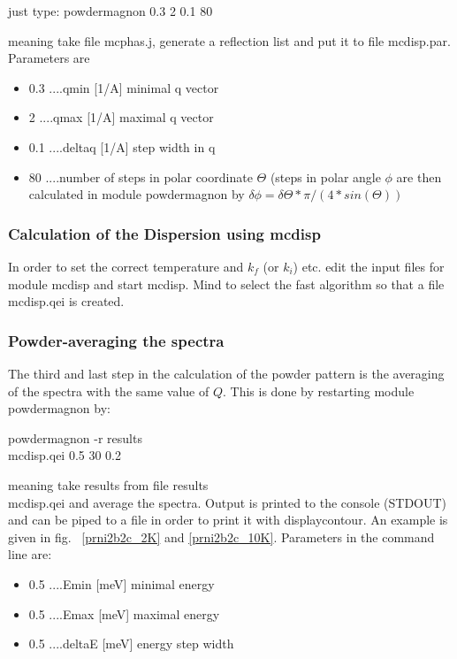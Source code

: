 just type: powdermagnon 0.3 2 0.1 80

meaning take file {\prg mcphas.j}, generate a reflection list and put it to 
file {\prg mcdisp.par}. Parameters are 
\begin{itemize}
\item
 0.3 ....qmin   [1/A] minimal q vector
\item
 2   ....qmax   [1/A] maximal q vector
\item
 0.1 ....deltaq [1/A] step width in q
\item
 80  ....number of steps in polar coordinate $\Theta$
        (steps in polar angle $\phi$ are  then calculated in module
        {\prg powdermagnon} by $\delta \phi= \delta \Theta*\pi/(4*sin(\Theta))$
\end{itemize}

\subsubsection{Calculation of the Dispersion using {\prg mcdisp}}

In order to set the correct temperature and $k_f$ (or $k_i$) etc. edit
the input files for module {\prg mcdisp} and start {\prg mcdisp}. Mind 
to select the fast algorithm so that a file {\prg mcdisp.qei} is created.

\subsubsection{Powder-averaging the spectra}
The third and last step in the calculation of the powder pattern is the averaging
of the spectra with the same value of $Q$. This is done by restarting module
{\prg powdermagnon} by: 

powdermagnon -r results\\mcdisp.qei 0.5 30 0.2 

meaning take  results from file {\prg results\\mcdisp.qei} and average the
spectra. Output is printed to the console (STDOUT) and can be piped to a file in
order to print it with {\prg displaycontour}. An example is given in fig.~
\ref{prni2b2c_2K} and \ref{prni2b2c_10K}.
Parameters in the command line are:
\begin{itemize}
\item 0.5 ....Emin   [meV] minimal energy
\item 0.5 ....Emax   [meV] maximal energy
\item 0.5 ....deltaE [meV] energy step width
\end{itemize}

